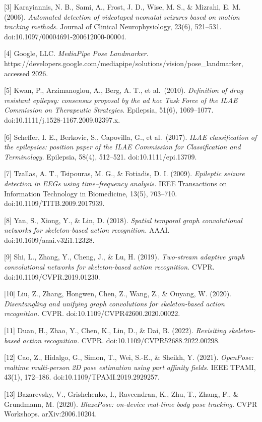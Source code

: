 \documentclass[
  11pt,
]{article}
\begin{document}
{[}3{]} Karayiannis, N. B., Sami, A., Frost, J. D., Wise, M. S., \&
Mizrahi, E. M. (2006). \emph{Automated detection of videotaped neonatal
seizures based on motion tracking methods.} Journal of Clinical
Neurophysiology, 23(6), 521--531. doi:10.1097/00004691-200612000-00004.

{[}4{]} Google, LLC. \emph{MediaPipe Pose Landmarker.}
https://developers.google.com/mediapipe/solutions/vision/pose\_landmarker,
accessed 2026.

{[}5{]} Kwan, P., Arzimanoglou, A., Berg, A. T., et al.~(2010).
\emph{Definition of drug resistant epilepsy: consensus proposal by the
ad hoc Task Force of the ILAE Commission on Therapeutic Strategies.}
Epilepsia, 51(6), 1069--1077. doi:10.1111/j.1528-1167.2009.02397.x.

{[}6{]} Scheffer, I. E., Berkovic, S., Capovilla, G., et al.~(2017).
\emph{ILAE classification of the epilepsies: position paper of the ILAE
Commission for Classification and Terminology.} Epilepsia, 58(4),
512--521. doi:10.1111/epi.13709.

{[}7{]} Tzallas, A. T., Tsipouras, M. G., \& Fotiadis, D. I. (2009).
\emph{Epileptic seizure detection in EEGs using time--frequency
analysis.} IEEE Transactions on Information Technology in Biomedicine,
13(5), 703--710. doi:10.1109/TITB.2009.2017939.

{[}8{]} Yan, S., Xiong, Y., \& Lin, D. (2018). \emph{Spatial temporal
graph convolutional networks for skeleton-based action recognition.}
AAAI. doi:10.1609/aaai.v32i1.12328.

{[}9{]} Shi, L., Zhang, Y., Cheng, J., \& Lu, H. (2019).
\emph{Two-stream adaptive graph convolutional networks for
skeleton-based action recognition.} CVPR. doi:10.1109/CVPR.2019.01230.

{[}10{]} Liu, Z., Zhang, Hongwen, Chen, Z., Wang, Z., \& Ouyang, W.
(2020). \emph{Disentangling and unifying graph convolutions for
skeleton-based action recognition.} CVPR.
doi:10.1109/CVPR42600.2020.00022.

{[}11{]} Duan, H., Zhao, Y., Chen, K., Lin, D., \& Dai, B. (2022).
\emph{Revisiting skeleton-based action recognition.} CVPR.
doi:10.1109/CVPR52688.2022.00298.

{[}12{]} Cao, Z., Hidalgo, G., Simon, T., Wei, S.-E., \& Sheikh, Y.
(2021). \emph{OpenPose: realtime multi-person 2D pose estimation using
part affinity fields.} IEEE TPAMI, 43(1), 172--186.
doi:10.1109/TPAMI.2019.2929257.

{[}13{]} Bazarevsky, V., Grishchenko, I., Raveendran, K., Zhu, T.,
Zhang, F., \& Grundmann, M. (2020). \emph{BlazePose: on-device real-time
body pose tracking.} CVPR Workshops. arXiv:2006.10204.
\end{document}
